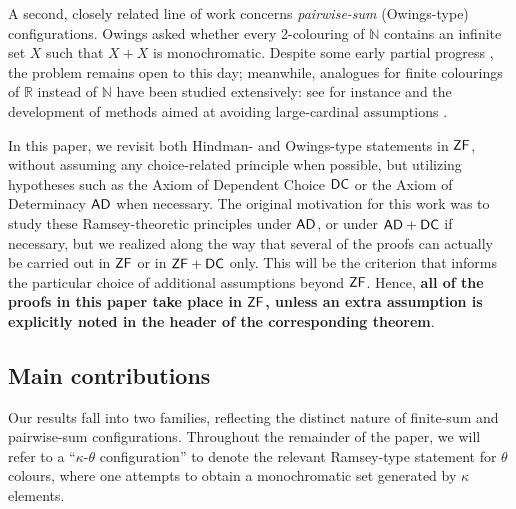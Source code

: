 \documentclass[10pt,a4paper]{amsart}
\theoremstyle{definition}
\newcommand{\zf}{\mathnormal{\mathsf{ZF}}}
\newcommand{\dc}{\mathnormal{\mathsf{DC}}}
\newcommand{\ad}{\mathnormal{\mathsf{AD}}}
\theoremstyle{remark}
\numberwithin{equation}{section}
\begin{document}
A second, closely related line of work concerns \emph{pairwise-sum} (Owings-type) configurations. 
Owings \cite{Owings1974} asked whether every 2-colouring of $\mathbb{N}$ contains an infinite set $X$ such that $X+X$ is monochromatic. Despite some early partial progress \cite{Hindman1979}, the problem remains open to this day; meanwhile, analogues for finite colourings of $\mathbb{R}$ instead of $\mathbb{N}$ have been studied extensively: see for instance \cite{HindmanLeaderStrauss2017, KomjathLeaderRussellShelahSoukupVidnyanszky2019, LeaderRussell2020} and the development of methods aimed at avoiding large-cardinal assumptions \cite{Zhang2020}. 

In this paper, we revisit both Hindman- and Owings-type statements in $\zf$, without assuming any choice-related principle when possible, but utilizing hypotheses such as the Axiom of Dependent Choice $\dc$ or the Axiom of Determinacy $\ad$ when necessary. The original motivation for this work was to study these Ramsey-theoretic principles under $\ad$, or under $\ad+\dc$ if necessary, but we realized along the way that several of the proofs can actually be carried out in $\zf$ or in $\zf+\dc$ only. This will be the criterion that informs the particular choice of additional assumptions beyond $\zf$. Hence, {\bf all of the proofs in this paper take place in $\zf$, unless an extra assumption is explicitly noted in the header of the corresponding theorem}.

\subsection*{Main contributions}\label{sec:main-contributions}
Our results fall into two families, reflecting the distinct nature of finite-sum and pairwise-sum configurations. Throughout the remainder of the paper, we will refer to a ``$\kappa$-$\theta$ configuration'' to denote the relevant Ramsey-type statement for $\theta$ colours, where one attempts to obtain a monochromatic set generated by $\kappa$ elements.
\end{document}
